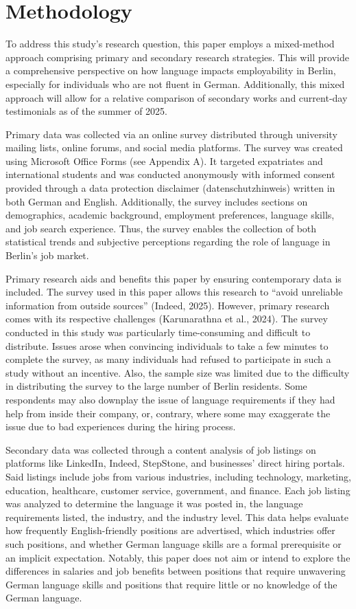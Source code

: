 \chapter{Methodology}

To address this study’s research question, this paper employs a mixed-method approach comprising primary and secondary research strategies. This will provide a comprehensive perspective on how language impacts employability in Berlin, especially for individuals who are not fluent in German. Additionally, this mixed approach will allow for a relative comparison of secondary works and current-day testimonials as of the summer of 2025.

Primary data was collected via an online survey distributed through university mailing lists, online forums, and social media platforms. The survey was created using Microsoft Office Forms (see Appendix A). It targeted expatriates and international students and was conducted anonymously with informed consent provided through a data protection disclaimer (datenschutzhinweis) written in both German and English. Additionally, the survey includes sections on demographics, academic background, employment preferences, language skills, and job search experience. Thus, the survey enables the collection of both statistical trends and subjective perceptions regarding the role of language in Berlin’s job market.

Primary research aids and benefits this paper by ensuring contemporary data is included. The survey used in this paper allows this research to “avoid unreliable information from outside sources” (Indeed, 2025). However, primary research comes with its respective challenges (Karunarathna et al., 2024). The survey conducted in this study was particularly time-consuming and difficult to distribute. Issues arose when convincing individuals to take a few minutes to complete the survey, as many individuals had refused to participate in such a study without an incentive. Also, the sample size was limited due to the difficulty in distributing the survey to the large number of Berlin residents. Some respondents may also downplay the issue of language requirements if they had help from inside their company, or, contrary, where some may exaggerate the issue due to bad experiences during the hiring process.

Secondary data was collected through a content analysis of job listings on platforms like LinkedIn, Indeed, StepStone, and businesses’ direct hiring portals. Said listings include jobs from various industries, including technology, marketing, education, healthcare, customer service, government, and finance. Each job listing was analyzed to determine the language it was posted in, the language requirements listed, the industry, and the industry level. This data helps evaluate how frequently English-friendly positions are advertised, which industries offer such positions, and whether German language skills are a formal prerequisite or an implicit expectation. Notably, this paper does not aim or intend to explore the differences in salaries and job benefits between positions that require unwavering German language skills and positions that require little or no knowledge of the German language.  

